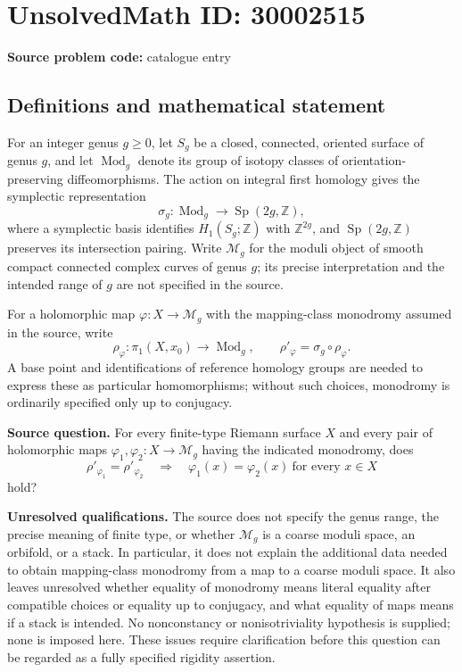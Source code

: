 \documentclass[11pt]{article}
\newcommand{\Z}{\mathbb{Z}}
\begin{document}
\section*{UnsolvedMath ID: 30002515}
\textbf{Source problem code:} catalogue entry
\subsection{Definitions and mathematical statement}
For an integer genus \(g\geq 0\), let \(S_g\) be a closed, connected, oriented surface of genus \(g\), and let \(\operatorname{Mod}_g\) denote its group of isotopy classes of orientation-preserving diffeomorphisms. The action on integral first homology gives the symplectic representation
\[
\sigma_g:\operatorname{Mod}_g\longrightarrow\operatorname{Sp}(2g,\Z),
\]
where a symplectic basis identifies \(H_1(S_g;\Z)\) with \(\Z^{2g}\), and \(\operatorname{Sp}(2g,\Z)\) preserves its intersection pairing. Write \(\mathcal M_g\) for the moduli object of smooth compact connected complex curves of genus \(g\); its precise interpretation and the intended range of \(g\) are not specified in the source.

For a holomorphic map \(\varphi:X\to\mathcal M_g\) with the mapping-class monodromy assumed in the source, write
\[
\rho_\varphi:\pi_1(X,x_0)\longrightarrow\operatorname{Mod}_g,
\qquad
\rho'_\varphi=\sigma_g\circ\rho_\varphi.
\]
A base point and identifications of reference homology groups are needed to express these as particular homomorphisms; without such choices, monodromy is ordinarily specified only up to conjugacy.

\textbf{Source question.} For every finite-type Riemann surface \(X\) and every pair of holomorphic maps \(\varphi_1,\varphi_2:X\to\mathcal M_g\) having the indicated monodromy, does
\[
\rho'_{\varphi_1}=\rho'_{\varphi_2}
\quad\Longrightarrow\quad
\varphi_1(x)=\varphi_2(x)\ \text{for every }x\in X
\]
hold?

\textbf{Unresolved qualifications.} The source does not specify the genus range, the precise meaning of finite type, or whether \(\mathcal M_g\) is a coarse moduli space, an orbifold, or a stack. In particular, it does not explain the additional data needed to obtain mapping-class monodromy from a map to a coarse moduli space. It also leaves unresolved whether equality of monodromy means literal equality after compatible choices or equality up to conjugacy, and what equality of maps means if a stack is intended. No nonconstancy or nonisotriviality hypothesis is supplied; none is imposed here. These issues require clarification before this question can be regarded as a fully specified rigidity assertion.
\end{document}
